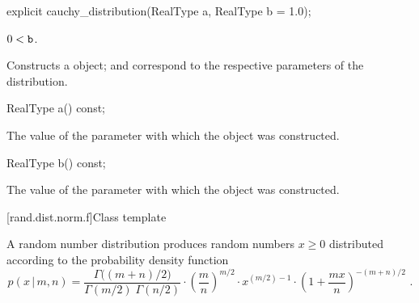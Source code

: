 %
\begin{itemdecl}
explicit cauchy_distribution(RealType a, RealType b = 1.0);
\end{itemdecl}

\begin{itemdescr}
\pnum
\requires $0 < \texttt{b}$.

\pnum
\effects Constructs a  object;
 and 
correspond to the respective parameters of the distribution.
\end{itemdescr}

%
\begin{itemdecl}
RealType a() const;
\end{itemdecl}

\begin{itemdescr}
\pnum\returns The value of the  parameter
 with which the object was constructed.
\end{itemdescr}

%
\begin{itemdecl}
RealType b() const;
\end{itemdecl}

\begin{itemdescr}
\pnum\returns The value of the  parameter
 with which the object was constructed.
\end{itemdescr}


[rand.dist.norm.f]{Class template }%
%
%

\pnum
A  random number distribution
produces random numbers $x \ge 0$
distributed according to
the probability density function%
%
%
\[ p(x\,|\,m,n) = \frac{\Gamma\big((m+n)/2\big)}{\Gamma(m/2) \; \Gamma(n/2)}
     \cdot \left(\frac{m}{n}\right)^{m/2}
     \cdot x^{(m/2)-1}
     \cdot \left(1 + \frac{m x}{n}\right)^{-(m + n)/2}
     \text{ .} \]


